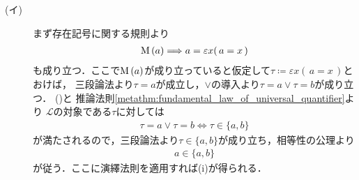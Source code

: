 	\begin{prf}\mbox{}
		\begin{description}
			\item[(イ)]
				まず存在記号に関する規則より
				\begin{align}
					\operatorname*{M}\left(a\right) \Longrightarrow a = \varepsilon x(\, a = x\, )
				\end{align}
				も成り立つ．ここで$\operatorname*{M}\left(a\right)$が成り立っていると仮定して$\tau \coloneqq \varepsilon x(\, a = x\, )$とおけば，
				三段論法より$\tau = a$が成立し，$\vee$の導入より$\tau = a \vee \tau = b$が成り立つ．
				()と
				推論法則\ref{metathm:fundamental_law_of_universal_quantifier}より
				$\mathcal{L}$の対象である$\tau$に対しては
				\begin{align}
					\tau = a \vee \tau = b \Longleftrightarrow \tau \in \{a,b\}
				\end{align}
				が満たされるので，三段論法より$\tau \in \{a,b\}$が成り立ち，相等性の公理より
				\begin{align}
					a \in \{a,b\}
				\end{align}
				が従う．ここに演繹法則を適用すれば(i)が得られる．
			

\end{description}
\end{prf}
